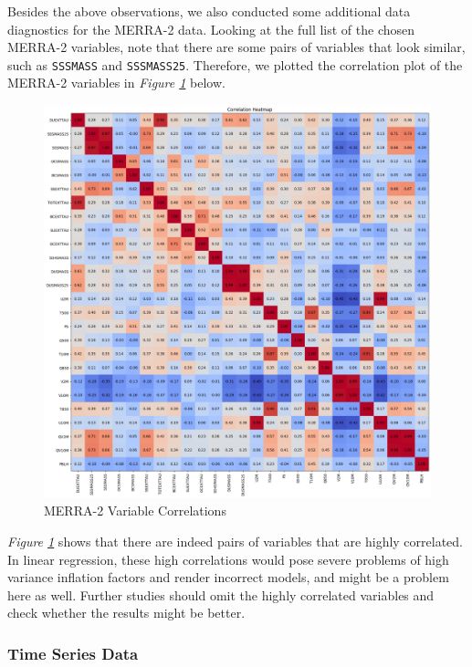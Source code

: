 \documentclass[draft]{agujournal2019}
\begin{document}
Besides the above observations, we also conducted some additional data diagnostics for the MERRA-2 data. Looking at the full list of the chosen MERRA-2 variables, note that there are some pairs of variables that look similar, such as \texttt{SSSMASS} and \texttt{SSSMASS25}. Therefore, we plotted the correlation plot of the MERRA-2 variables in \textit{Figure \ref{fig:correlations}} below.

\begin{figure}[htbp]
    \centering
\includegraphics[width=\textwidth]{calibration/correlations.png}
    \caption{MERRA-2 Variable Correlations}
    \label{fig:correlations}
\end{figure}

\textit{Figure \ref{fig:correlations}} shows that there are indeed pairs of variables that are highly correlated. In linear regression, these high correlations would pose severe problems of high variance inflation factors and render incorrect models, and might be a problem here as well. Further studies should omit the highly correlated variables and check whether the results might be better.

\subsubsection{Time Series Data}
\end{document}

